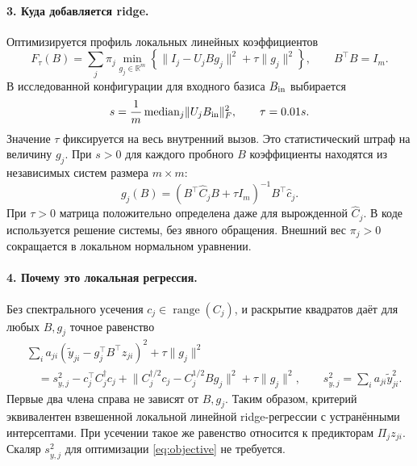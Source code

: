 \documentclass[11pt,a4paper]{article}
\newcommand{\R}{\mathbb R}
\newcommand{\norm}[1]{\lVert#1\rVert}
\begin{document}
\paragraph{3. Куда добавляется ridge.}
Оптимизируется профиль локальных линейных коэффициентов
\begin{equation}\label{eq:objective}
 \boxed{\displaystyle
 F_\tau(B)=\sum_j\pi_j\min_{g_j\in\R^m}
 \left\{\norm{I_j-U_jBg_j}^2+\tau\norm{g_j}^2\right\},
 \qquad B^\top B=I_m.}
\end{equation}
В исследованной конфигурации для входного базиса $B_{\rm in}$ выбирается
\begin{equation}\label{eq:ridge}
 s=\frac1m\operatorname{median}_j\norm{U_jB_{\rm in}}_F^2,
 \qquad \tau=0.01s.
\end{equation}
Значение $\tau$ фиксируется на весь внутренний вызов. Это статистический
штраф на величину $g_j$. При $s>0$ для каждого пробного $B$ коэффициенты находятся
из независимых систем размера $m\times m$:
\begin{equation}\label{eq:profile}
 \boxed{\displaystyle
 g_j(B)=(B^\top\widehat C_jB+\tau I_m)^{-1}B^\top\widehat c_j.}
\end{equation}
При $\tau>0$ матрица положительно определена даже для вырожденной
$\widehat C_j$. В коде используется решение системы, без явного обращения.
Внешний вес $\pi_j>0$ сокращается в локальном нормальном уравнении.

\paragraph{4. Почему это локальная регрессия.}
Без спектрального усечения $c_j\in\operatorname{range}(C_j)$, и раскрытие
квадратов даёт для любых $B,g_j$ точное равенство
\begin{align}\label{eq:wls}
 &\sum_i a_{ji}(\widetilde y_{ji}-g_j^\top B^\top z_{ji})^2
       +\tau\norm{g_j}^2\nonumber\\
 &\quad=s_{y,j}^2-c_j^\top C_j^\dagger c_j
       +\norm{C_j^{\dagger/2}c_j-C_j^{1/2}Bg_j}^2
       +\tau\norm{g_j}^2,
 \qquad s_{y,j}^2=\sum_i a_{ji}\widetilde y_{ji}^2.
\end{align}
Первые два члена справа не зависят от $B,g_j$. Таким образом, критерий
эквивалентен взвешенной локальной линейной ridge-регрессии с устранёнными
интерсептами. При усечении такое же равенство относится к предикторам
$\Pi_jz_{ji}$. Скаляр $s_{y,j}^2$ для оптимизации \eqref{eq:objective}
не требуется.
\end{document}
